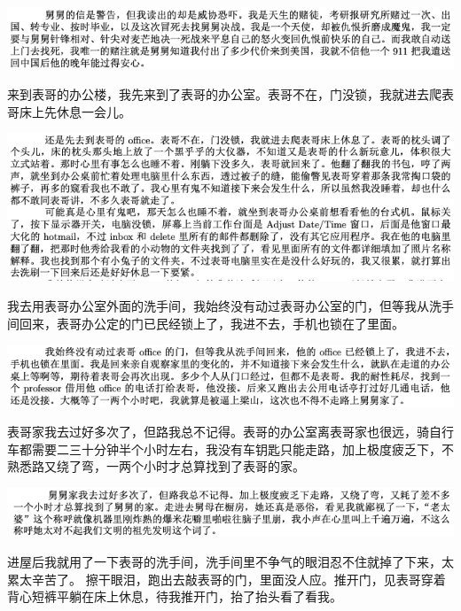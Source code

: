 \documentclass[9pt, b5paper]{article}
\begin{document}
\begin{center}
\includegraphics[width=.9\linewidth]{./pic/p1p67-2.png}
\end{center}

来到表哥的办公楼，我先来到了表哥的办公室。表哥不在，门没锁，我就进去爬表哥床上先休息一会儿。 

\begin{center}
\includegraphics[width=.9\linewidth]{./pic/p1p67-3.png}
\end{center}

我去用表哥办公室外面的洗手间，我始终没有动过表哥办公室的门，但等我从洗手间回来，表哥办公定的门已民经锁上了，我进不去，手机也锁在了里面。 

\begin{center}
\includegraphics[width=.9\linewidth]{./pic/p1p67-4.png}
\end{center}

表哥家我去过好多次了，但路我总不记得。表哥的办公室离表哥家也很远，骑自行车都需要二三十分钟半个小时左右，我没有车钥匙只能走路，加上极度疲乏下，不熟悉路又绕了弯，一两个小时才总算找到了表哥的家。 

\begin{center}
\includegraphics[width=.9\linewidth]{./pic/p1p67-5.png}
\end{center}

进屋后我就用了一下表哥的洗手间，洗手间里不争气的眼泪忍不住就掉了下来，太累太辛苦了。 擦干眼泪，跑出去敲表哥的门，里面没人应。推开门，见表哥穿着背心短裤平躺在床上休息，待我推开门，抬了抬头看了看我。 
\end{document}
